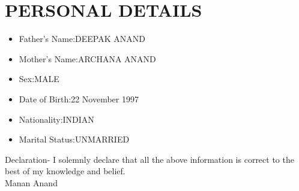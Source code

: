 \documentclass{article}
\begin{document}
\section{PERSONAL DETAILS}
\begin{itemize}
\item Father's Name:DEEPAK ANAND

\item Mother's Name:ARCHANA ANAND

\item Sex:MALE

\item Date of Birth:22 November 1997

\item Nationality:INDIAN

\item Marital Status:UNMARRIED
\end{itemize}
\Large Declaration-
I solemnly declare that all the above information is correct to the best of my knowledge and belief.\\
\LARGE Manan Anand\\
\end{document}

